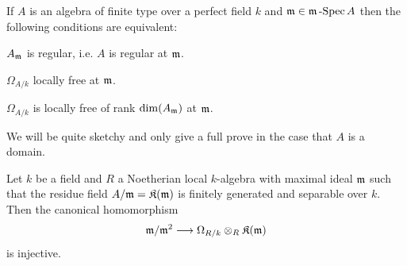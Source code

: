 \documentclass[a4paper,parskip=half,numbers=enddot, DIV=12]{scrreprt}
\begin{document}
\begin{prop}
    If $A$ is an algebra of finite type over a perfect field $k$ and $\mathfrak{m}\in\mathfrak{m}\operatorname{-Spec} A$ then the following conditions are equivalent:
    \begin{alphanumerate}
      \item 
        $A_{\mathfrak{m}}$ is regular, i.e. $A$ is regular at $\mathfrak{m}$.
      \item 
        $\Omega_{A/k}$ locally free at $\mathfrak{m}$.
      \item 
        $\Omega_{A/k}$ is locally free of rank $\dim(A_{\mathfrak{m}})$ at $\mathfrak{m}$.
    \end{alphanumerate}
\end{prop}
We will be quite sketchy and only give a full prove in the case that $A$ is a domain.
\begin{lem}
	Let $k$ be a field and $R$ a Noetherian local $k$-algebra with maximal ideal $\mathfrak{m}$ such that the residue field $A/\mathfrak{m}=\mathfrak{K}(\mathfrak{m})$ is finitely generated and separable over $k$. Then the canonical homomorphism
	\begin{align*}
		\mm/\mm^2\morphism\Omega_{R/k}\otimes_R\KK(\mm)
	\end{align*}
	is injective.
\end{lem}
\end{document}
